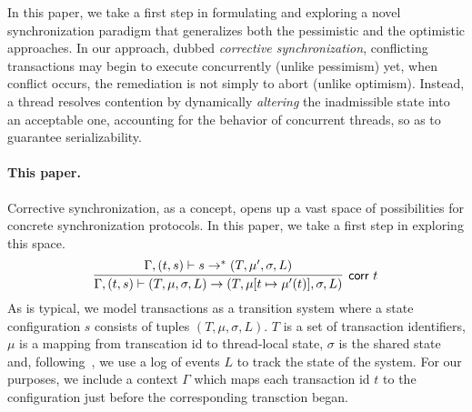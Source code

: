 %
In this paper, we take a first step in formulating and exploring a novel synchronization paradigm that generalizes both the pessimistic and the optimistic approaches.
%
In our approach, dubbed \emph{corrective synchronization}, conflicting transactions may begin to execute concurrently (unlike pessimism) yet, when conflict occurs, the remediation is not simply to abort (unlike optimism). Instead, a thread resolves contention by dynamically \emph{altering} the inadmissible state into an acceptable one, accounting for the behavior of concurrent threads, so as to guarantee serializability.





\paragraph{This paper.} Corrective synchronization, as a concept, opens up a vast space of possibilities for concrete synchronization protocols. In this paper, we take a first step in exploring this space.
%
$$
\infer[\text{{\sf corr }} t]{\Gamma, (t,s) \vdash (T, \mu, \sigma, L) \rightarrow (T,\mu[t \mapsto \mu'(t)], \sigma, L)}{
   \Gamma, (t,s) \vdash
	s \rightarrow^{*} (T,\mu', \sigma, L)}
$$
As is typical, we model transactions as a transition system
where a state configuration $s$ consists of tuples $(T,\mu,\sigma,L)$.
$T$ is a set of transaction identifiers,  $\mu$ is a mapping from
transcation id to thread-local state, $\sigma$ is the shared state
and, following~\cite{KoskinenP15}, we use a log of events $L$ to track the
state of the system.
%
For our purposes, we include a context $\Gamma$ which maps each transaction
id $t$ to the configuration just before the corresponding transction began.

